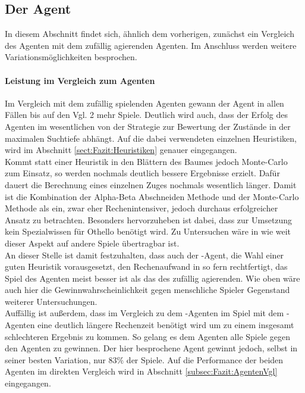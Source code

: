 \subsection{Der Agent }
In diesem Abschnitt findet sich, ähnlich dem vorherigen, zunächst ein Vergleich des  Agenten mit dem zufällig agierenden Agenten. Im Anschluss werden weitere Variationsmöglichkeiten besprochen. 
\paragraph{Leistung im Vergleich zum Agenten }
Im Vergleich mit dem zufällig spielenden Agenten gewann der Agent  in allen Fällen bis auf den Vgl. 2 mehr Spiele. Deutlich wird auch, dass der Erfolg des Agenten im wesentlichen von der Strategie zur Bewertung der Zustände in der maximalen Suchtiefe abhängt. Auf die dabei verwendeten einzelnen Heuristiken, wird im Abschnitt \ref{sect:Fazit:Heuristiken} genauer eingegangen.
\\Kommt statt einer Heuristik in den Blättern des Baumes jedoch Monte-Carlo zum Einsatz, so werden nochmals deutlich bessere Ergebnisse erzielt. Dafür dauert die Berechnung eines einzelnen Zuges nochmals wesentlich länger. Damit ist die Kombination der Alpha-Beta Abschneiden Methode und der Monte-Carlo Methode als ein, zwar eher Rechenintensiver, jedoch durchaus erfolgreicher Ansatz zu betrachten. Besonders hervorzuheben ist dabei, dass zur Umsetzung kein Spezialwissen für Othello benötigt wird. Zu Untersuchen wäre in wie weit dieser Aspekt auf andere Spiele übertragbar ist.
\\An dieser Stelle ist damit festzuhalten, dass auch der -Agent, die Wahl einer guten Heuristik vorausgesetzt, den Rechenaufwand in so fern rechtfertigt, das Spiel des Agenten meist besser ist als das des zufällig agierenden. Wie oben wäre auch hier die Gewinnwahrscheinlichkeit gegen menschliche Spieler Gegenstand weiterer Untersuchungen.
\\Auffällig ist außerdem, dass im Vergleich zu dem -Agenten im Spiel mit dem -Agenten eine deutlich längere Rechenzeit benötigt wird um zu einem insgesamt schlechteren Ergebnis zu kommen. So gelang es dem Agenten  alle Spiele gegen den Agenten  zu gewinnen. Der hier besprochene Agent gewinnt jedoch, selbst in seiner besten Variation, nur $83\%$ der Spiele. Auf die Performance der beiden Agenten im direkten Vergleich wird in Abschnitt \ref{subsec:Fazit:AgentenVgl} eingegangen.
